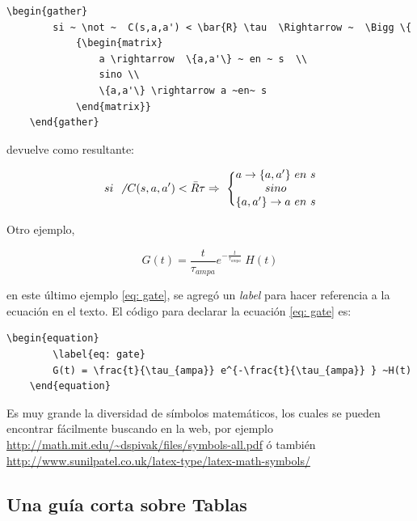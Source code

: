 \begin{lstlisting}[basicstyle=\small,tabsize=4]
	\begin{gather}
		si ~ \not ~  C(s,a,a') < \bar{R} \tau  \Rightarrow ~  \Bigg \{ 
			{\begin{matrix}
				a \rightarrow  \{a,a'\} ~ en ~ s  \\
				sino \\
				\{a,a'\} \rightarrow a ~en~ s
			\end{matrix}}
	\end{gather}
\end{lstlisting}
 
 devuelve como resultante:
 
 \begin{gather}
 	si ~ \not ~  C(s,a,a') < \bar{R} \tau  \Rightarrow ~  \Bigg \{ 
 		{\begin{matrix}
 			a \rightarrow  \{a,a'\} ~ en ~ s  \\
 			sino \\
 			\{a,a'\} \rightarrow a ~en~ s
 		\end{matrix}}
 \end{gather}

Otro ejemplo, 

\begin{equation}
	\label{eq: gate}
	G(t) = \frac{t}{\tau_{ampa}} e^{-\frac{t}{\tau_{ampa}} } ~H(t)
\end{equation}

en este último ejemplo \ref{eq: gate}, se agregó un \emph{label}  para hacer referencia a la ecuación en el texto. El código para declarar la ecuación \ref{eq: gate} es: 

\begin{lstlisting}[basicstyle=\small,tabsize=4]
	\begin{equation}
		\label{eq: gate}
		G(t) = \frac{t}{\tau_{ampa}} e^{-\frac{t}{\tau_{ampa}} } ~H(t)
	\end{equation}
\end{lstlisting}
 

Es muy grande la diversidad de símbolos matemáticos, los cuales se pueden encontrar fácilmente buscando en la web, por ejemplo \url{http://math.mit.edu/~dspivak/files/symbols-all.pdf} ó también \url{http://www.sunilpatel.co.uk/latex-type/latex-math-symbols/}

\subsection{Una guía corta sobre Tablas}


